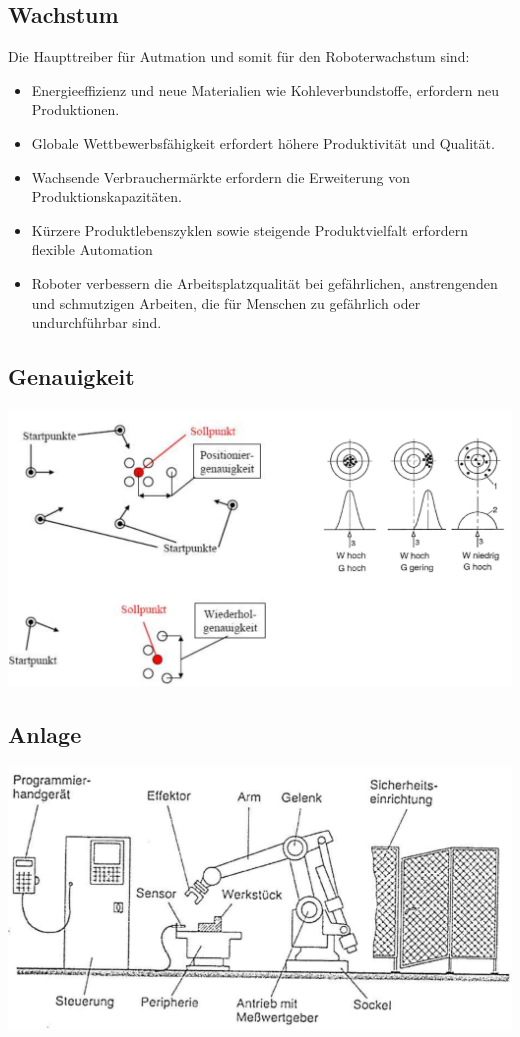 \subsection{Wachstum}
Die Haupttreiber für Autmation und somit für den Roboterwachstum sind:
\begin{itemize}
    \item Energieeffizienz und neue Materialien wie Kohleverbundstoffe, erfordern neu Produktionen.
    \item Globale Wettbewerbsfähigkeit erfordert höhere Produktivität und Qualität.
    \item Wachsende Verbrauchermärkte erfordern die Erweiterung von Produktionskapazitäten.
    \item Kürzere Produktlebenszyklen sowie steigende Produktvielfalt erfordern flexible Automation
    \item Roboter verbessern die Arbeitsplatzqualität bei gefährlichen, anstrengenden und schmutzigen Arbeiten, die für Menschen zu gefährlich oder undurchführbar sind.
\end{itemize}
\begin{minipage}{0.5\linewidth}
    \subsection{Genauigkeit}
    \includegraphics[width=\linewidth]{./bilder/genauigkeit}
\end{minipage}
    \begin{minipage}{0.5\linewidth}
    \subsection{Anlage}
    \includegraphics[width=\linewidth]{./bilder/anlage}
\end{minipage}
\clearpage
